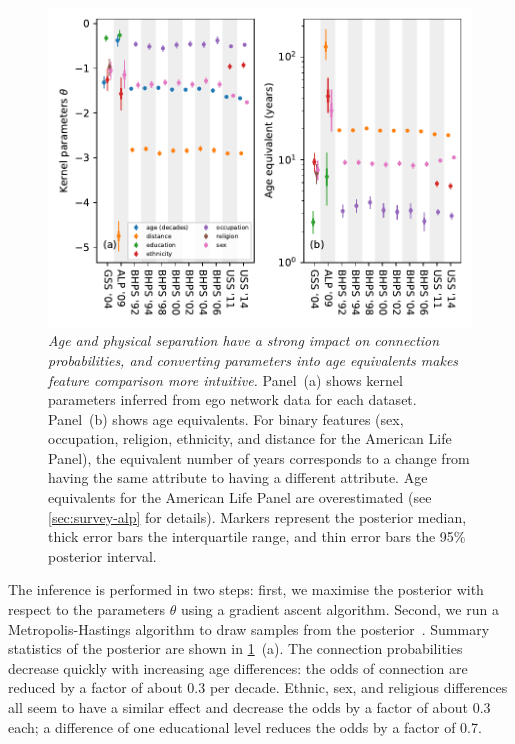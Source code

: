 \documentclass{scrartcl}
\newcommand{\titlecaption}[2]{\caption[#1]{\emph{#1} #2}}
\begin{document}
\begin{figure}
    \includegraphics{coefficients-age-equivalent}
    \titlecaption{Age and physical separation have a strong impact on connection probabilities, and converting parameters into age equivalents makes feature comparison more intuitive.}{
    Panel~(a) shows kernel parameters inferred from ego network data for each dataset.
    Panel~(b) shows age equivalents. For binary features (sex, occupation, religion, ethnicity, and distance for the American Life Panel), the equivalent number of years corresponds to a change from having the same attribute to having a different attribute. Age equivalents for the American Life Panel are overestimated (see \cref{sec:survey-alp} for details).
    Markers represent the posterior median, thick error bars the interquartile range, and thin error bars the 95\% posterior interval.\label{fig:parameters-and-age-equivalents}}
\end{figure}

The inference is performed in two steps: first, we maximise the posterior with respect to the parameters $\theta$ using a gradient ascent algorithm. Second, we run a Metropolis-Hastings algorithm to draw samples from the posterior~\cite{Hastings1970}. Summary statistics of the posterior are shown in \cref{fig:parameters-and-age-equivalents}~(a). The connection probabilities decrease quickly with increasing age differences: the odds of connection are reduced by a factor of about 0.3 per decade. Ethnic, sex, and religious differences all seem to have a similar effect and decrease the odds by a factor of about 0.3 each; a difference of one educational level reduces the odds by a factor of 0.7.
\end{document}
